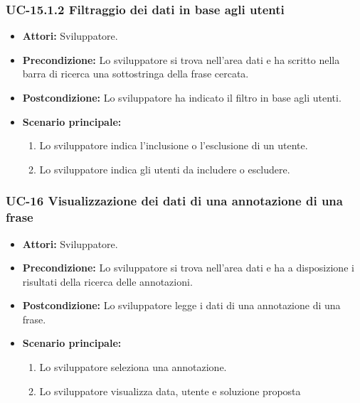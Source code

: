 	\subsubsection{UC-15.1.2 Filtraggio dei dati in base agli utenti}	
		\begin{itemize}
			\item \textbf{Attori:} Sviluppatore.
			\item \textbf{Precondizione:} Lo sviluppatore si trova nell'area dati e ha scritto nella barra di ricerca una sottostringa della frase cercata.
			\item \textbf{Postcondizione:} Lo sviluppatore ha indicato il filtro in base agli utenti.
			\item \textbf{Scenario principale:}
				\begin{enumerate}
					\item Lo sviluppatore indica l'inclusione o l'esclusione di un utente.
					\item Lo sviluppatore indica gli utenti da includere o escludere.
				\end{enumerate}
		\end{itemize}
		
	\subsubsection{UC-16 Visualizzazione dei dati di una annotazione di una frase}
		\begin{itemize}
			\item \textbf{Attori:} Sviluppatore.
			\item \textbf{Precondizione:} Lo sviluppatore si trova nell'area dati e ha a disposizione i risultati della ricerca delle annotazioni.
			\item \textbf{Postcondizione:} Lo sviluppatore legge i dati di una annotazione di una frase.
			\item \textbf{Scenario principale:}
				\begin{enumerate}
					\item Lo sviluppatore seleziona una annotazione.
					\item Lo sviluppatore visualizza data, utente e soluzione proposta
				\end{enumerate}
		\end{itemize}
	
